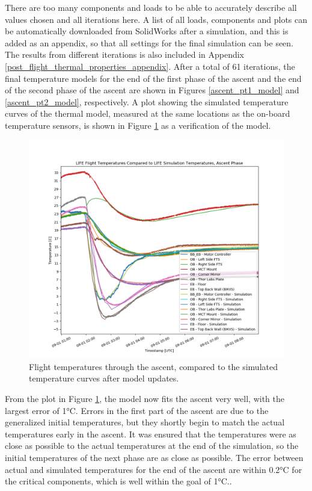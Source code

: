There are too many components and loads to be able to accurately describe all values chosen and all iterations here. A list of all loads, components and plots can be automatically downloaded from SolidWorks after a simulation, and this is added as an appendix, so that all settings for the final simulation can be seen. The results from different iterations is also included in Appendix \ref{post_flight_thermal_properties_appendix}. After a total of 61 iterations, the final temperature models for the end of the first phase of the ascent and the end of the second phase of the ascent are shown in Figures \ref{ascent_pt1_model} and \ref{ascent_pt2_model}, respectively. A plot showing the simulated temperature curves of the thermal model, measured at the same locations as the on-board temperature sensors, is shown in Figure \ref{fig:ascent_temps_with_sims} as a verification of the model.

\begin{figure}
    \centering
    \includegraphics[width=\textwidth]{chap4_images/ascent_images/ascent_with_sim_temps_no_altitude.png}
    \caption{Flight temperatures through the ascent, compared to the simulated temperature curves after model updates.}
    \label{fig:ascent_temps_with_sims}
\end{figure}

From the plot in Figure \ref{fig:ascent_temps_with_sims}, the model now fits the ascent very well, with the largest error of 1°C. Errors in the first part of the ascent are due to the generalized initial temperatures, but they shortly begin to match the actual temperatures early in the ascent. It was ensured that the temperatures were as close as possible to the actual temperatures at the end of the simulation, so the initial temperatures of the next phase are as close as possible. The error between actual and simulated temperatures for the end of the ascent are within 0.2°C for the critical components, which is well within the goal of 1°C..

